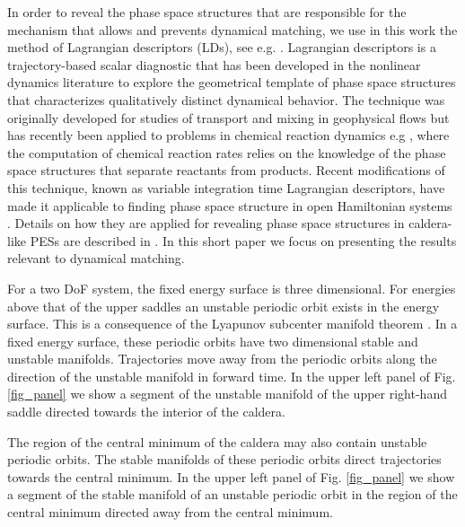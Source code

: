 \documentclass[a4paper,10pt]{article}
\begin{document}
In order to reveal the phase space structures that are responsible for the mechanism that allows and prevents dynamical matching, we use in this work the method of Lagrangian descriptors (LDs), see e.g. \cite{mancho2013lagrangian,lopesino2017,naik2019a}. Lagrangian descriptors is a trajectory-based scalar diagnostic that has been developed in the nonlinear dynamics literature to explore the geometrical template of phase space structures that characterizes qualitatively distinct dynamical behavior. The technique was originally developed for studies of transport and mixing in geophysical flows \cite{madrid2009} but has recently been applied to problems in chemical reaction dynamics  e.g \cite{craven2015lagrangian,craven2016deconstructing,craven2017lagrangian}, where the computation of chemical reaction rates relies on the knowledge of the phase space structures that separate reactants from products. Recent modifications of this technique, known as variable integration time Lagrangian descriptors, have made it applicable to finding phase space structure in open Hamiltonian systems \cite{junginger2017chemical,naik2019b,GG2019}. Details on how they are applied for revealing phase space structures in caldera-like PESs are described in \cite{KGW2019,KGW2019a}. In this short paper we focus on presenting the results relevant to dynamical matching.

For a two DoF system, the fixed energy surface is three dimensional. For energies above that of the upper saddles  an unstable periodic orbit exists in the energy surface. This is a consequence of the Lyapunov subcenter manifold theorem \cite{moser1976, weinstein1973, rabinowitz1982}. In a fixed energy surface, these periodic orbits have two dimensional stable and unstable manifolds. Trajectories move away from the periodic orbits along the direction of the unstable manifold in forward time. In the upper left panel of Fig. \ref{fig_panel} we show a segment of the unstable manifold of the upper right-hand saddle directed towards the interior of the caldera.

The region of the central minimum of the caldera may also contain unstable periodic orbits. The stable manifolds of these periodic orbits direct trajectories towards the central minimum. In the upper left panel of Fig. \ref{fig_panel} we show a segment of the stable manifold of an unstable periodic orbit in the region of the central minimum directed away from the central minimum.
\end{document}
